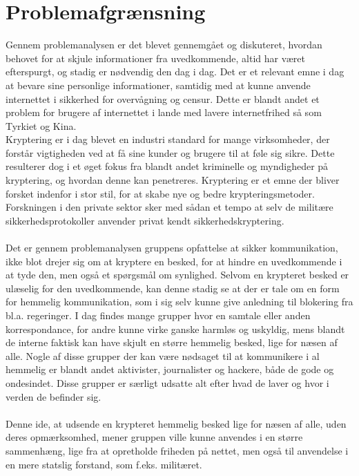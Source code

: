 \section{Problemafgrænsning}
Gennem problemanalysen er det blevet gennemgået og diskuteret, hvordan behovet for at skjule informationer fra uvedkommende, altid har været efterspurgt, og stadig er nødvendig den dag i dag. Det er et relevant emne i dag at bevare sine personlige informationer, samtidig med at kunne anvende internettet i sikkerhed for overvågning og censur. Dette er blandt andet et problem for brugere af internettet i lande med lavere internetfrihed så som Tyrkiet og Kina.\\
\noindent
Kryptering er i dag blevet en industri standard for mange virksomheder, der forstår vigtigheden ved at få sine kunder og brugere til at føle sig sikre. Dette resulterer dog i et øget fokus fra blandt andet kriminelle og myndigheder på kryptering, og hvordan denne kan penetreres.
Kryptering er et emne der bliver forsket indenfor i stor stil, for at skabe nye og bedre krypteringsmetoder. Forskningen i den private sektor sker med sådan et tempo at selv de militære sikkerhedsprotokoller anvender privat kendt sikkerhedskryptering.\cite{ForsvaretsSikkerhed}
\\\\
Det er gennem problemanalysen gruppens opfattelse at sikker kommunikation, ikke blot drejer sig om at kryptere en besked, for at hindre en uvedkommende i at tyde den, men også et spørgsmål om synlighed. Selvom en krypteret besked er ulæselig for den uvedkommende, kan denne stadig se at der er tale om en form for hemmelig kommunikation, som i sig selv kunne give anledning til blokering fra bl.a. regeringer. I dag findes mange grupper hvor en samtale eller anden korrespondance, for andre kunne virke ganske harmløs og uskyldig, mens blandt de interne faktisk kan have skjult en større hemmelig besked, lige for næsen af alle. Nogle af disse grupper der kan være nødsaget til at kommunikere i al hemmelig er blandt andet aktivister, journalister og hackere, både de gode og ondesindet. Disse grupper er særligt udsatte alt efter hvad de laver og hvor i verden de befinder sig.
\\\\
Denne ide, at udsende en krypteret hemmelig besked lige for næsen af alle, uden deres opmærksomhed, mener gruppen ville kunne anvendes i en større sammenhæng, lige fra at opretholde friheden på nettet, men også til anvendelse i en mere statslig forstand, som f.eks. militæret. 
